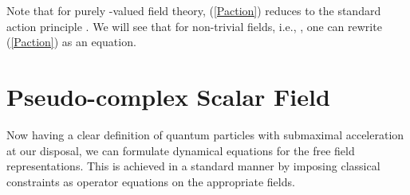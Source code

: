 \documentclass[a4paper,aps,prd,showkeys,showpacs,superscriptaddress,preprint]{revtex4}
\providecommand{\pc}{\mathbb{P}}
\begin{document}
Note that for purely \coordHE{}-valued field theory, (\ref{Paction}) reduces to the
standard action principle \coordHE{}. We will see that for
non-trivial fields, i.e.,  \myHighlight{$\phi \not\in {\pc_{F}}_\pm^0$}\coordHE{}, one can rewrite
(\ref{Paction}) as an equation.


\section{Pseudo-complex Scalar Field\label{sec_pcFT}}
Now having a clear definition of quantum particles with submaximal
acceleration at our disposal, we can formulate dynamical equations for
the free field representations. This is achieved in a standard manner
by imposing classical constraints as operator equations on the
appropriate fields.
\end{document}
